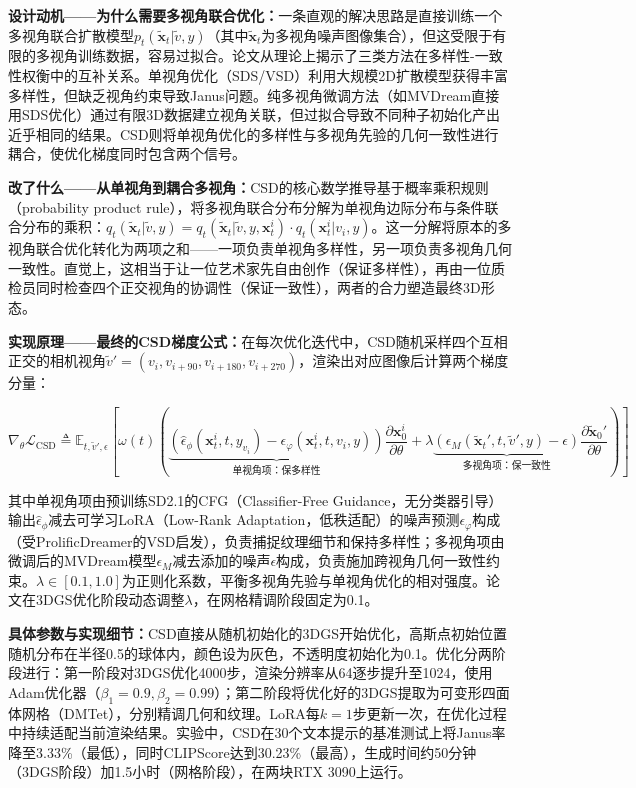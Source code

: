 \textbf{设计动机——为什么需要多视角联合优化：}一条直观的解决思路是直接训练一个多视角联合扩散模型$p_t(\tilde{\mathbf{x}}_t|\tilde{v}, y)$（其中$\tilde{\mathbf{x}}_t$为多视角噪声图像集合），但这受限于有限的多视角训练数据，容易过拟合。论文从理论上揭示了三类方法在多样性-一致性权衡中的互补关系。单视角优化（SDS/VSD）利用大规模2D扩散模型获得丰富多样性，但缺乏视角约束导致Janus问题。纯多视角微调方法（如MVDream直接用SDS优化）通过有限3D数据建立视角关联，但过拟合导致不同种子初始化产出近乎相同的结果。CSD则将单视角优化的多样性与多视角先验的几何一致性进行耦合，使优化梯度同时包含两个信号。

\textbf{改了什么——从单视角到耦合多视角：}CSD的核心数学推导基于概率乘积规则（probability product rule），将多视角联合分布分解为单视角边际分布与条件联合分布的乘积：$q_t(\tilde{\mathbf{x}}_t|\tilde{v}, y) = q_t(\tilde{\mathbf{x}}_t|\tilde{v}, y, \mathbf{x}_t^i) \cdot q_t(\mathbf{x}_t^i|v_i, y)$。这一分解将原本的多视角联合优化转化为两项之和——一项负责单视角多样性，另一项负责多视角几何一致性。直觉上，这相当于让一位艺术家先自由创作（保证多样性），再由一位质检员同时检查四个正交视角的协调性（保证一致性），两者的合力塑造最终3D形态。

\textbf{实现原理——最终的CSD梯度公式：}在每次优化迭代中，CSD随机采样四个互相正交的相机视角$\tilde{v}' = (v_i, v_{i+90}, v_{i+180}, v_{i+270})$，渲染出对应图像后计算两个梯度分量：

\begin{equation}
\nabla_\theta \mathcal{L}_{\text{CSD}} \triangleq \mathbb{E}_{t, \tilde{v}', \epsilon}\left[\omega(t)\left(\underbrace{(\hat{\epsilon}_\phi(\mathbf{x}_t^i, t, y_{v_i}) - \epsilon_\varphi(\mathbf{x}_t^i, t, v_i, y))}_{\text{单视角项：保多样性}}\frac{\partial \mathbf{x}_0^i}{\partial \theta} + \lambda\underbrace{(\epsilon_M(\tilde{\mathbf{x}}_t', t, \tilde{v}', y) - \epsilon)}_{\text{多视角项：保一致性}}\frac{\partial \tilde{\mathbf{x}}_0'}{\partial \theta}\right)\right]
\end{equation}

其中单视角项由预训练SD2.1的CFG（Classifier-Free Guidance，无分类器引导）输出$\hat{\epsilon}_\phi$减去可学习LoRA（Low-Rank Adaptation，低秩适配）的噪声预测$\epsilon_\varphi$构成（受ProlificDreamer的VSD启发），负责捕捉纹理细节和保持多样性；多视角项由微调后的MVDream模型$\epsilon_M$减去添加的噪声$\epsilon$构成，负责施加跨视角几何一致性约束。$\lambda \in [0.1, 1.0]$为正则化系数，平衡多视角先验与单视角优化的相对强度。论文在3DGS优化阶段动态调整$\lambda$，在网格精调阶段固定为0.1。

\textbf{具体参数与实现细节：}CSD直接从随机初始化的3DGS开始优化，高斯点初始位置随机分布在半径0.5的球体内，颜色设为灰色，不透明度初始化为0.1。优化分两阶段进行：第一阶段对3DGS优化4000步，渲染分辨率从64逐步提升至1024，使用Adam优化器（$\beta_1=0.9, \beta_2=0.99$）；第二阶段将优化好的3DGS提取为可变形四面体网格（DMTet），分别精调几何和纹理。LoRA每$k=1$步更新一次，在优化过程中持续适配当前渲染结果。实验中，CSD在30个文本提示的基准测试上将Janus率降至3.33\%（最低），同时CLIPScore达到30.23\%（最高），生成时间约50分钟（3DGS阶段）加1.5小时（网格阶段），在两块RTX 3090上运行。

